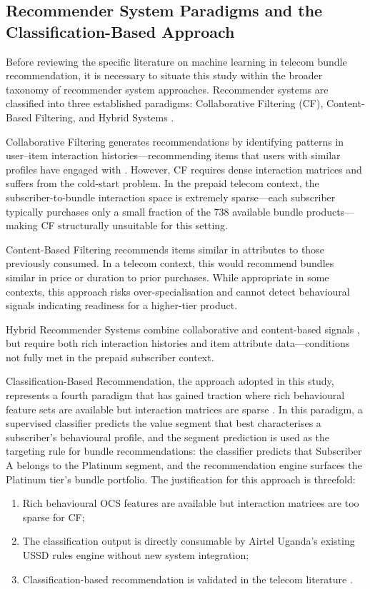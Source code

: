 \subsection{Recommender System Paradigms and the Classification-Based Approach}

Before reviewing the specific literature on machine learning in telecom bundle recommendation, it is necessary to situate this study within the broader taxonomy of recommender system approaches. Recommender systems are classified into three established paradigms: Collaborative Filtering (CF), Content-Based Filtering, and Hybrid Systems \cite{ref1, ref19}.

Collaborative Filtering generates recommendations by identifying patterns in user--item interaction histories---recommending items that users with similar profiles have engaged with \cite{ref26, ref40}. However, CF requires dense interaction matrices and suffers from the cold-start problem. In the prepaid telecom context, the subscriber-to-bundle interaction space is extremely sparse---each subscriber typically purchases only a small fraction of the 738 available bundle products---making CF structurally unsuitable for this setting.

Content-Based Filtering recommends items similar in attributes to those previously consumed. In a telecom context, this would recommend bundles similar in price or duration to prior purchases. While appropriate in some contexts, this approach risks over-specialisation and cannot detect behavioural signals indicating readiness for a higher-tier product.

Hybrid Recommender Systems combine collaborative and content-based signals \cite{ref19}, but require both rich interaction histories and item attribute data---conditions not fully met in the prepaid subscriber context.

Classification-Based Recommendation, the approach adopted in this study, represents a fourth paradigm that has gained traction where rich behavioural feature sets are available but interaction matrices are sparse \cite{ref53, ref44}. In this paradigm, a supervised classifier predicts the value segment that best characterises a subscriber's behavioural profile, and the segment prediction is used as the targeting rule for bundle recommendations: the classifier predicts that Subscriber A belongs to the Platinum segment, and the recommendation engine surfaces the Platinum tier's bundle portfolio. The justification for this approach is threefold:
\begin{enumerate}
    \item Rich behavioural OCS features are available but interaction matrices are too sparse for CF;
    \item The classification output is directly consumable by Airtel Uganda's existing USSD rules engine without new system integration;
    \item Classification-based recommendation is validated in the telecom literature \cite{ref8, ref44}.
\end{enumerate}

